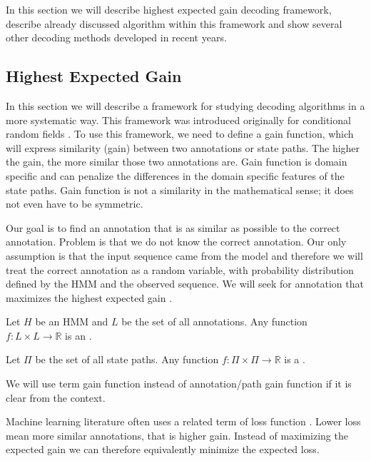 In this section we will describe highest expected gain decoding framework,
describe already discussed algorithm within this framework and show several
other decoding methods developed in recent years.

\subsection{Highest Expected Gain}

\label{SECTION:HEG}

In this section we will describe a framework for studying decoding algorithms in
a more systematic way. This framework was introduced  originally for
conditional random fields \cite{Gross2007}.  To use this framework, we need to
define a gain function, which will express similarity (gain) between two
annotations or state paths. The higher the gain, the more similar those two
annotations are. Gain function is domain specific and can penalize the differences
in the domain specific features of the state paths.  Gain function is not a
similarity in the mathematical sense; it does not even have to be symmetric.

Our goal is to find an annotation that is as similar as possible to the correct
annotation. Problem is that we do not know the correct annotation. Our only
assumption is that the input sequence came from the model and therefore we will
treat the correct annotation as a random variable, with probability distribution
defined by the HMM and the observed sequence. We will seek for annotation that
maximizes the highest expected gain \cite{Nanasi2010,Nanasi2010mgr}.

\begin{definition}
Let $H$ be an HMM and $L$ be the set of all annotations. Any function
$f:L\times L\to \mathbb{R}$ is an .

Let $\Pi$ be the set of all state paths. Any function $f:\Pi\times
\Pi\to\mathbb{R}$ is a .
\label{DEFINITION:GAINFUNCTION}
\end{definition}

\begin{note}
We will use term gain function instead of annotation/path gain function if it is
clear from the context.

Machine learning literature often uses a related term of loss function
\cite{Lember2010}. Lower loss mean more similar annotations, that is higher gain. Instead
of maximizing the expected gain we can therefore equivalently minimize the expected
loss.
\end{note}

